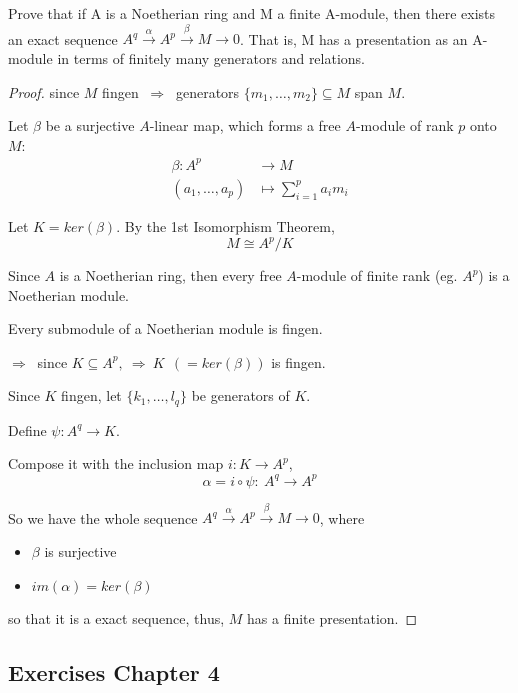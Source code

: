 \documentclass{article}
\theoremstyle{definition}
\newenvironment{ex}[1]
{\renewcommand\theinnerex{#1}\innerex}
{\endinnerex}
\begin{document}
\begin{ex}{R.3.4}
  Prove that if A is a Noetherian ring and M a finite A-module, then there
  exists an exact sequence $A^q \stackrel{\alpha}{\longrightarrow} A^p \stackrel{\beta}{\longrightarrow} M \longrightarrow 0$.
  That is, M has a presentation as an A-module in terms of finitely many generators and relations.
\end{ex}
\begin{proof}
  since $M$ fingen $~\Longrightarrow~$ generators $\{m_1, \ldots, m_2 \} \subseteq M$ span $M$.

  Let $\beta$ be a surjective $A$-linear map, which forms a free $A$-module of rank $p$ onto $M$:
  \begin{align*}
    \beta: A^p &\longrightarrow M\\
    (a_1, \ldots, a_p) &\longmapsto \sum_{i=1}^p a_i m_i
  \end{align*}

  Let $K=ker(\beta)$. By the 1st Isomorphism Theorem,
  $$M \cong A^p / K$$

  Since $A$ is a Noetherian ring, then every free $A$-module of finite rank (eg. $A^p$) is a Noetherian module.

  Every submodule of a Noetherian module is fingen.

  $\Longrightarrow~$ since $K \subseteq A^p, ~\Longrightarrow~ K ~~(=ker(\beta))$ is fingen.

  Since $K$ fingen, let $\{k_1, \ldots, l_q\}$ be generators of $K$.

  Define $\psi: A^q \longrightarrow K$.

  Compose it with the inclusion map $i: K \longrightarrow A^p$,
  $$\alpha = i \circ \psi:~ A^q \longrightarrow A^p$$

  So we have the whole sequence $A^q \stackrel{\alpha}{\longrightarrow} A^p \stackrel{\beta}{\longrightarrow} M \longrightarrow 0$, where
  \begin{itemize}
    \item $\beta$ is surjective
    \item $im(\alpha)=ker(\beta)$
  \end{itemize}
  so that it is a exact sequence, thus, $M$ has a finite presentation.
\end{proof}

\subsection{Exercises Chapter 4}
\end{document}
